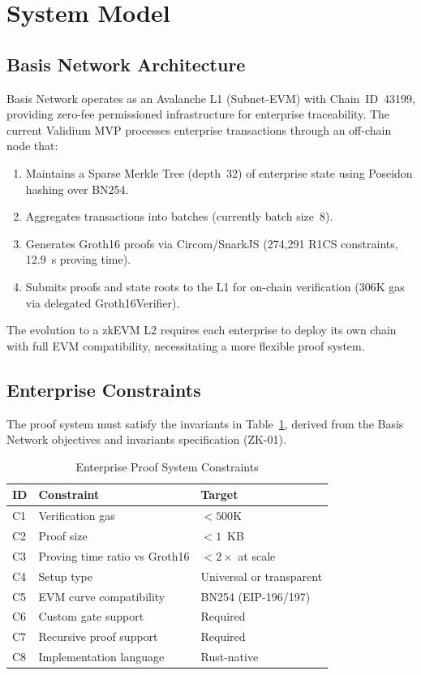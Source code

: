 
\section{System Model}
\label{sec:system}

\subsection{Basis Network Architecture}

Basis Network operates as an Avalanche L1 (Subnet-EVM) with
Chain~ID~43199, providing zero-fee permissioned infrastructure
for enterprise traceability. The current Validium MVP processes
enterprise transactions through an off-chain node that:

\begin{enumerate}
  \item Maintains a Sparse Merkle Tree (depth~32) of enterprise
    state using Poseidon hashing over BN254.
  \item Aggregates transactions into batches (currently batch
    size~8).
  \item Generates Groth16 proofs via Circom/SnarkJS (274,291
    R1CS constraints, 12.9~s proving time).
  \item Submits proofs and state roots to the L1 for on-chain
    verification (306K gas via delegated Groth16Verifier).
\end{enumerate}

The evolution to a zkEVM L2 requires each enterprise to deploy
its own chain with full EVM compatibility, necessitating a more
flexible proof system.

\subsection{Enterprise Constraints}

The proof system must satisfy the invariants in
Table~\ref{tab:constraints}, derived from the Basis Network
objectives and invariants specification (ZK-01).

\begin{table}[htbp]
\caption{Enterprise Proof System Constraints}
\label{tab:constraints}
\centering
\begin{tabular}{@{}lll@{}}
\toprule
\textbf{ID} & \textbf{Constraint} & \textbf{Target} \\
\midrule
C1 & Verification gas & $< 500$K \\
C2 & Proof size & $< 1$~KB \\
C3 & Proving time ratio vs Groth16 & $< 2\times$ at scale \\
C4 & Setup type & Universal or transparent \\
C5 & EVM curve compatibility & BN254 (EIP-196/197) \\
C6 & Custom gate support & Required \\
C7 & Recursive proof support & Required \\
C8 & Implementation language & Rust-native \\
\bottomrule
\end{tabular}
\end{table}

